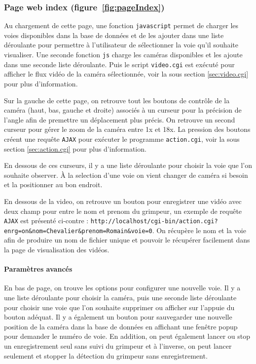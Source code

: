 \documentclass[a4paper, 11pt, french]{article}
\begin{document}
\subsubsection{Page web index (figure~\ref{fig:pageIndex})}
Au chargement de cette page, une fonction \texttt{javascript} permet de charger les voies disponibles dans la base de données et de les ajouter dans une liste déroulante pour permettre à l'utilisateur de sélectionner la voie qu'il souhaite visualiser. Une seconde fonction \texttt{js} charge les caméras disponibles et les ajoute dans une seconde liste déroulante. Puis le script \texttt{video.cgi} est exécuté pour afficher le flux vidéo de la caméra sélectionnée, voir la sous section \ref{sec:video.cgi} pour plus d'information.


Sur la gauche de cette page, on retrouve tout les boutons de contrôle de la caméra (haut, bas, gauche et droite) associés à un curseur pour la précision de l'angle afin de premettre un déplacement plus précis. On retrouve un second curseur pour gérer le zoom de la caméra entre 1x et 18x. La pression des boutons créent une requête \texttt{AJAX} pour exécuter le programme \texttt{action.cgi}, voir la sous section \ref{sec:action.cgi} pour plus d'information.


En dessous de ces curseurs, il y a une liste déroulante pour choisir la voie que l'on souhaite observer. À la selection d'une voie on vient changer de caméra si besoin et la positionner au bon endroit.

En dessous de la video, on retrouve un bouton pour enregistrer une vidéo avec deux champ pour entre le nom et prenom du grimpeur, un exemple de requête \texttt{AJAX} est présenté ci-contre : \texttt{http://localhost/cgi-bin/action.cgi?enrg=on\&nom=Chevalier\&prenom=Romain\&voie=0}. On récupère le nom et la voie afin de produire un nom de fichier unique et pouvoir le récupérer facilement dans la page de visualisation des vidéos.



\paragraph{Paramètres avancés}  En bas de page, on trouve les options pour configurer une nouvelle voie. Il y a une liste déroulante pour choisir la caméra, puis une seconde liste déroulante pour choisir une voie que l'on souhaite supprimer ou afficher sur l'appuie du bouton adéquat. Il y a également un bouton pour sauvegarder une nouvelle position de la caméra dans la base de données en affichant une fenêtre popup pour demander le numéro de voie. 
En addition, on peut également lancer ou stop un enregistrement seul sans suivi du grimpeur et à l'inverse, on peut lancer seulement et stopper la détection du grimpeur sans enregistrement.
\end{document}

